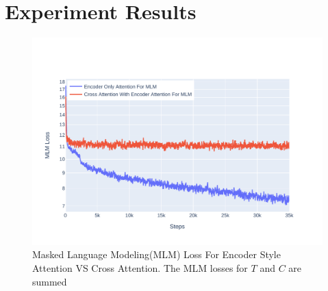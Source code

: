 \section{Experiment Results}
\label{table_classification:experiement-result}
\begin{figure}[h]
    \centering
    \includegraphics[width=\maxwidth{\textwidth}]{src/images/mlm-loss-comparison.pdf}
    \caption{Masked Language Modeling(MLM) Loss For Encoder Style Attention VS Cross Attention. The MLM losses for $T$ and $C$ are summed}
    \label{figure\arabic{figurecounter}}
\end{figure}

